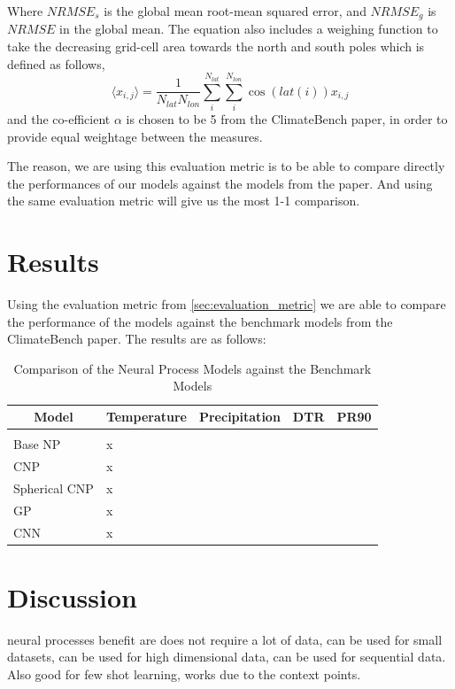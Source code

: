 \documentclass{article} %
\begin{document}
Where $NRMSE_s$ is the global mean root-mean squared error, and $NRMSE_g$ is $NRMSE$ in the global mean. The equation also includes a weighing function to take the decreasing grid-cell area towards the north and south poles which is defined as follows,
\begin{equation}
    \langle x_{i, j} \rangle = \frac{1}{N_{lat}N_{lon}}\sum_i^{N_{lat}}\sum_i^{N_{lon}} \cos(lat(i))x_{i, j}
\end{equation}
and the co-efficient $\alpha$ is chosen to be 5 from the ClimateBench paper, in order to provide equal weightage between the measures.

The reason, we are using this evaluation metric is to be able to compare directly the performances of our models against the models from the paper. And using the same evaluation metric will give us the most 1-1 comparison.

\section{Results}
Using the evaluation metric from \ref{sec:evaluation_metric} we are able to compare the performance of the models against the benchmark models from the ClimateBench paper. The results are as follows:

\begin{table}[t]
    \label{results-table}
    \begin{center}
        \begin{tabular}{lllll}
        \multicolumn{1}{c}{\bf Model}  &\multicolumn{1}{c}{\bf Temperature} & \multicolumn{1}{c}{\bf Precipitation} & \multicolumn{1}{c}{\bf DTR} & \multicolumn{1}{c}{\bf PR90}
        \\ \hline \\
        Base NP         & x \\
        CNP            & x \\
        Spherical CNP  & x \\
        GP             & x \\
        CNN             & x \\
        \end{tabular}
    \end{center}
    \caption{Comparison of the Neural Process Models against the Benchmark Models}
\end{table}

\section{Discussion}
neural processes benefit are does not require a lot of data, can be used for small datasets, can be used for high dimensional data, can be used for sequential data. Also good for few shot learning, works due to the context points.
\end{document}
